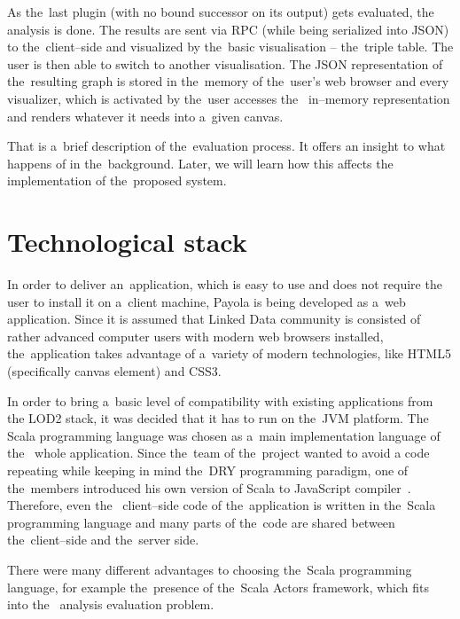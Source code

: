 As the~last plugin (with no bound successor on its output) gets evaluated, the~
analysis is done. The results are sent via RPC (while being serialized into JSON) 
to the~client--side and visualized by the~basic visualisation -- the~triple 
table. The user is then able to switch to another visualisation. The JSON 
representation of the~resulting graph is stored in the~memory of the~user's web 
browser and every visualizer, which is activated by the~user accesses the~
in--memory representation and renders whatever it needs into a~given canvas.

That is a~brief description of the~evaluation process. It offers an insight
to what happens of in the~background. Later, we will learn how this affects 
the implementation of the~proposed system.

\section{Technological stack}
In order to deliver an~application, which is easy to use and does not require 
the user to install it on a~client machine, Payola is being developed as a~web
application. Since it is assumed that Linked Data community is consisted of
rather advanced computer users with modern web browsers installed, the~application 
takes advantage of a~variety of modern technologies, like HTML5 (specifically
canvas element) and CSS3.

In order to bring a~basic level of compatibility with existing applications from 
the LOD2 stack, it was decided that it has to run on the~JVM platform. The 
Scala programming language was chosen as a~main implementation language of the~
whole application. Since the~team of the~project wanted to avoid a code repeating 
while keeping in mind the~DRY programming paradigm, one of the~members 
introduced his own version of Scala to JavaScript compiler~\cite{s2js}. Therefore, even the~
client--side code of the~application is written in the~Scala programming language 
and many parts of the~code are shared between the~client--side and the~server 
side.

There were many different advantages to choosing the~Scala programming language, 
for example the~presence of the~Scala Actors framework, which fits into the~
analysis evaluation problem.

